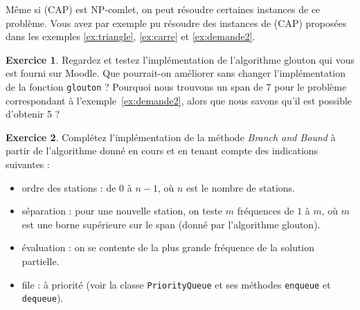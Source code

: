 \documentclass[a4paper,francais]{article}
\theoremstyle{definition}
\newtheorem{exercice}{Exercice}[section]
\begin{document}
Même si (CAP) est NP-comlet, on peut résoudre certaines instances
de ce problème. Vous avez par exemple pu résoudre des instances de (CAP)
proposées dans les exemples \ref{ex:triangle}, \ref{ex:carre} et
\ref{ex:demande2}. 

\begin{exercice}
  Regardez et testez l'implémentation de l'algorithme glouton qui
  vous est fourni sur Moodle. Que pourrait-on améliorer sans changer
  l'implémentation de la fonction \verb!glouton! ? %
  Pourquoi nous trouvons un span de 7 pour le problème correspondant
  à l'exemple~\ref{ex:demande2}, alors que nous savons qu'il est
  possible d'obtenir 5 ?
\end{exercice}

\begin{exercice}
  Complétez l'implémentation de la méthode \emph{Branch and Bound}
  à partir de l'algorithme donné en cours et en tenant compte des
  indications suivantes :
  \begin{itemize}
  \item ordre des stations : de $0$ à $n-1$, où $n$ est le nombre de stations. 
  \item séparation : pour une nouvelle station, on teste $m$ fréquences
    de $1$ à $m$, où $m$ est une borne supérieure sur le span (donné
    par l'algorithme glouton).
  \item évaluation : on se contente de la plus grande fréquence de
    la solution partielle.
  \item file : à priorité (voir la classe \verb!PriorityQueue! et
    ses méthodes \verb!enqueue! et \verb!dequeue!). 
  \end{itemize}
\end{exercice}
\end{document}
